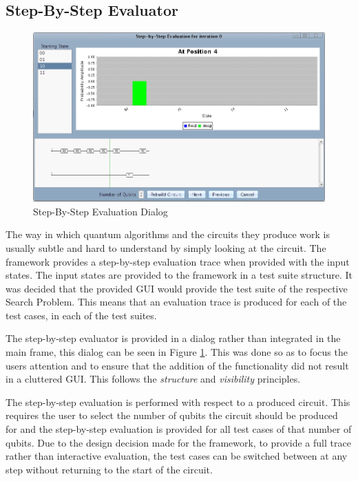 \subsection{Step-By-Step Evaluator}
\label{sec:sbse}

\begin{figure}
 \includegraphics[width=\textwidth]{StepByStepEval.jpg}
\caption{Step-By-Step Evaluation Dialog}
\label{fig:StepByStepEval}
\end{figure}
The way in which quantum algorithms and the circuits they produce work is usually subtle and hard to understand by simply looking at the circuit.
The framework provides a step-by-step evaluation trace when provided with the input states.
The input states are provided to the framework in a test suite structure.
It was decided that the provided GUI would provide the test suite of the respective Search Problem.
This means that an evaluation trace is produced for each of the test cases, in each of the test suites.

The step-by-step evaluator is provided in a dialog rather than integrated in the main frame, this dialog can be seen in Figure \ref{fig:StepByStepEval}.
This was done so as to focus the users attention and to ensure that the addition of the functionality did not result in a cluttered GUI.
This follows the \emph{structure} and \emph{visibility} principles.

The step-by-step evaluation is performed with respect to a produced circuit.
This requires the user to select the number of qubits the circuit should be produced for and the step-by-step evaluation is provided for all test cases of that number of qubits.
Due to the design decision made for the framework, to provide a full trace rather than interactive evaluation, the test cases can be switched between at any step without returning to the start of the circuit.

